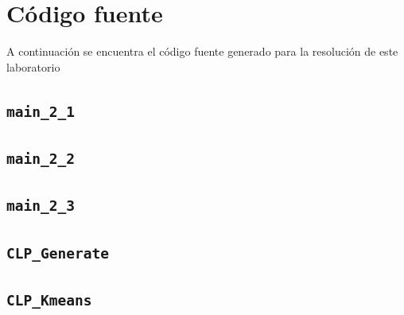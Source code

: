 \documentclass[11pt]{article} %
\begin{document}
\clearpage

\section{Código fuente}
\label{sec:src_code}

A continuación se encuentra el código fuente generado para la resolución de
este laboratorio

\subsection{\texttt{main\_2\_1}}
\label{src:main:21}



\subsection{\texttt{main\_2\_2}}
\label{src:main:22}



\clearpage

\subsection{\texttt{main\_2\_3}}
\label{src:main:23}



\clearpage

\subsection{\texttt{CLP\_Generate}}
\label{src:fun:generate}



\clearpage

\subsection{\texttt{CLP\_Kmeans}}
\label{src:fun:kmeans}



\clearpage



\end{document}
